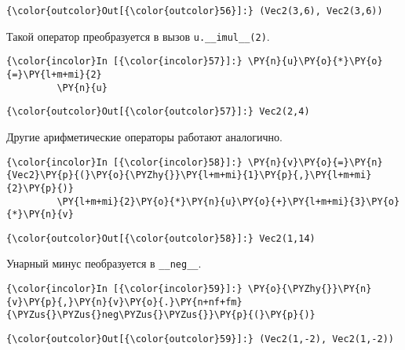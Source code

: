            \begin{Verbatim}[commandchars=\\\{\}]
{\color{outcolor}Out[{\color{outcolor}56}]:} (Vec2(3,6), Vec2(3,6))
\end{Verbatim}
        
    Такой оператор преобразуется в вызов \texttt{u.\_\_imul\_\_(2)}.

    \begin{Verbatim}[commandchars=\\\{\}]
{\color{incolor}In [{\color{incolor}57}]:} \PY{n}{u}\PY{o}{*}\PY{o}{=}\PY{l+m+mi}{2}
         \PY{n}{u}
\end{Verbatim}

            \begin{Verbatim}[commandchars=\\\{\}]
{\color{outcolor}Out[{\color{outcolor}57}]:} Vec2(2,4)
\end{Verbatim}
        
    Другие арифметические операторы работают аналогично.

    \begin{Verbatim}[commandchars=\\\{\}]
{\color{incolor}In [{\color{incolor}58}]:} \PY{n}{v}\PY{o}{=}\PY{n}{Vec2}\PY{p}{(}\PY{o}{\PYZhy{}}\PY{l+m+mi}{1}\PY{p}{,}\PY{l+m+mi}{2}\PY{p}{)}
         \PY{l+m+mi}{2}\PY{o}{*}\PY{n}{u}\PY{o}{+}\PY{l+m+mi}{3}\PY{o}{*}\PY{n}{v}
\end{Verbatim}

            \begin{Verbatim}[commandchars=\\\{\}]
{\color{outcolor}Out[{\color{outcolor}58}]:} Vec2(1,14)
\end{Verbatim}
        
    Унарный минус пеобразуется в \texttt{\_\_neg\_\_}.

    \begin{Verbatim}[commandchars=\\\{\}]
{\color{incolor}In [{\color{incolor}59}]:} \PY{o}{\PYZhy{}}\PY{n}{v}\PY{p}{,}\PY{n}{v}\PY{o}{.}\PY{n+nf+fm}{\PYZus{}\PYZus{}neg\PYZus{}\PYZus{}}\PY{p}{(}\PY{p}{)}
\end{Verbatim}

            \begin{Verbatim}[commandchars=\\\{\}]
{\color{outcolor}Out[{\color{outcolor}59}]:} (Vec2(1,-2), Vec2(1,-2))
\end{Verbatim}
        
